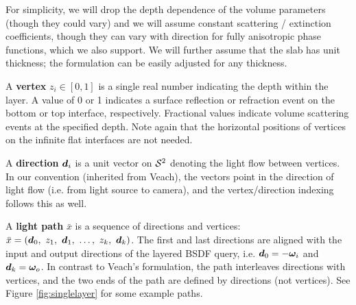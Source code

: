 For simplicity, we will drop the depth dependence of the volume parameters (though they could vary) and we will assume constant scattering / extinction coefficients, though they can vary with direction for fully anisotropic phase functions, which we also support. We will further assume that the slab has unit thickness; the formulation can be easily adjusted for any thickness.

A {\bf vertex} $z_i \in [0, 1]$ is a single real number indicating the depth within the layer. A value of 0 or 1 indicates a surface reflection or refraction event on the bottom or top interface, respectively. Fractional values indicate volume scattering events at the specified depth. Note again that the horizontal positions of vertices on the infinite flat interfaces are not needed.

A {\bf direction} $\bm{d}_i$ is a unit vector on ${\mathcal S^2}$ denoting the light flow between vertices. In our convention (inherited from Veach), 
the vectors point in the direction of light flow (i.e. from light source to camera), and the vertex/direction indexing follows this as well.

A {\bf light path} $\bar x$ is a sequence of directions and vertices: $\bar x = (\bd_0,\ z_1,\ \bd_1,\ \dots,\ z_k,\ \bd_k)$.
 The first and last directions are aligned with the input and output directions of the layered BSDF query, i.e. $\bm{d}_0 = -\bm{\omega}_i$ and $\bm{d}_k = \bm{\omega}_o$. In contrast to Veach's formulation, the path interleaves directions with vertices, and the two ends of the path are defined by directions (not vertices). See Figure \ref{fig:singlelayer} for some example paths.

